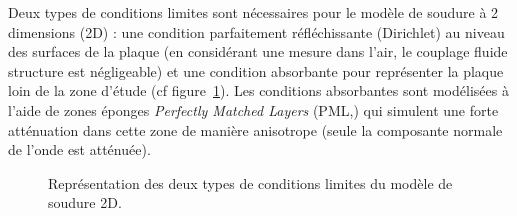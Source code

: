 Deux types de conditions limites sont nécessaires pour le modèle de soudure à 2 dimensions (2D) : une condition parfaitement réfléchissante (Dirichlet) au niveau des surfaces de la plaque (en considérant une mesure dans l'air, le couplage fluide structure est négligeable) et une condition absorbante pour représenter la plaque loin de la zone d'étude (cf figure~\ref{BC}). Les conditions absorbantes sont modélisées à l'aide de zones éponges \emph{Perfectly Matched Layers} (PML,\cite{berenger}) qui simulent une forte atténuation dans cette zone de manière anisotrope (seule la composante normale de l'onde est atténuée).\\

\begin{figure}[!h]
	\centering
	\caption{Représentation des deux types de conditions limites du modèle de soudure 2D.\label{BC}}
\end{figure}


